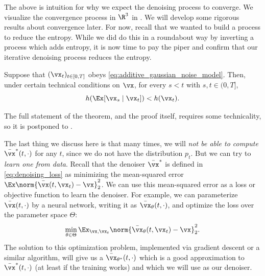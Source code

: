 \documentclass[../../book-main.tex]{subfiles}
\begin{document}
The above is intuition for why we expect the denoising process to converge. We visualize the convergence process in \(\R^{3}\) in . We will develop some rigorous results about convergence later. For now, recall that we wanted to build a process to reduce the entropy. While we did do this in a roundabout way by inverting a process which adds entropy, it is now time to pay the piper and confirm that our iterative denoising process reduces the entropy.

\begin{theorem}
	Suppose that \((\vx_{t})_{t \in [0, T]}\) obeys \eqref{eq:additive_gaussian_noise_model}. Then, under certain technical conditions on \(\vx\), for every \(s < t\) with \(s, t \in (0, T]\),
	\begin{equation}
		h(\Ex[\vx_{s} \mid \vx_{t}]) < h(\vx_{t}).
	\end{equation}
\end{theorem}
The full statement of the theorem, and the proof itself, requires some technicality, so it is postponed to .

The last thing we discuss here is that many times, we will \textit{not be able to compute} \(\bar{\vx}^{\ast}(t, \cdot)\) for any \(t\), since we do not have the distribution \(p_{t}\). But we can try to \textit{learn one from data}. Recall that the denoiser \(\bar{\vx}^{\ast}\) is defined in \eqref{eq:denoising_loss} as minimizing the mean-squared error \(\Ex\norm{\bar{\vx}(t, \vx_{t}) - \vx}_{2}^{2}\). We can use this mean-squared error as a loss or objective function to learn the denoiser. For example, we can parameterize \(\bar{\vx}(t, \cdot)\) by a neural network, writing it as \(\bar{\vx}_{\theta}(t, \cdot)\), and optimize the loss over the parameter space \(\Theta\):
\begin{equation}
	\min_{\theta \in \Theta}\Ex_{\vx, \vx_{t}}\norm{\bar{\vx}_{\theta}(t, \vx_{t}) - \vx}_{2}^{2}.
\end{equation}
The solution to this optimization problem, implemented via gradient descent or a similar algorithm, will give us a \(\bar{\vx}_{\theta^{\ast}}(t, \cdot)\) which is a good approximation to \(\bar{\vx}^{\ast}(t, \cdot)\) (at least if the training works) and which we will use as our denoiser.
\end{document}

